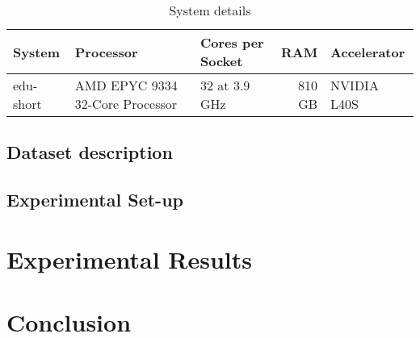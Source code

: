 \documentclass[conference]{IEEEtran}
\begin{document}
        \begin{table}[ht]
            \centering
            \begin{adjustbox}{width=\columnwidth}
            \begin{tabular}{lllrl}
            \toprule
            \textbf{System} &  \textbf{Processor} & \textbf{Cores per Socket} & \textbf{RAM} & \textbf{Accelerator} \\
            \midrule
                edu-short & AMD EPYC 9334 32-Core Processor & 32 at 3.9 GHz & 810 GB & NVIDIA L40S \\
            \bottomrule
            \end{tabular}
            \end{adjustbox}
            \vspace{1em}
            
            \caption{System details}
            \label{tab:system_description}
        \end{table}

        \subsection{Dataset description}

        \subsection{Experimental Set-up}

    \section{Experimental Results}

    \section{Conclusion}

    
    
\end{document}

